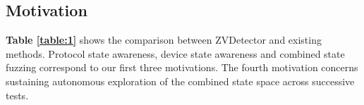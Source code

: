 \documentclass[10pt,journal,compsoc]{IEEEtran}
\begin{document}
           
                
     
            

\subsection{Motivation} \label{motivation}

\textbf{Table \ref{table:1}} shows the comparison between ZVDetector and existing methods. Protocol state awareness, device state awareness and combined state fuzzing correspond to our first three motivations. The fourth motivation concerns sustaining autonomous exploration of the combined state space across successive tests. \\ \vspace{-0.2cm}
\end{document}
